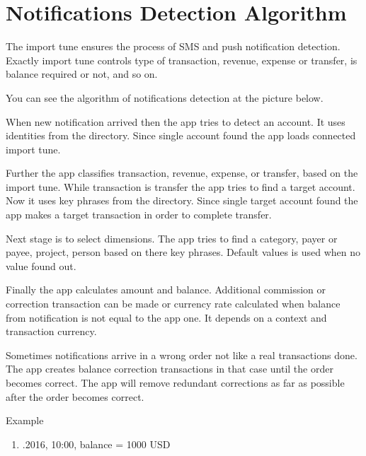 \documentclass[a4paper,10pt,english]{sphinxmanual}
\begin{document}
\section{Notifications Detection Algorithm}
\label{\detokenize{notifications:notifications-detection-algorithm}}
\sphinxAtStartPar
The import tune ensures the process of SMS and push notification detection. Exactly import
tune controls type of transaction, revenue, expense or transfer, is balance required or not,
and so on.

\sphinxAtStartPar
You can see the algorithm of notifications detection at the picture below.


\sphinxAtStartPar
When new notification arrived then the app tries to detect an account. It uses identities from the
 directory. Since single account found the app loads connected import tune.

\sphinxAtStartPar
Further the app classifies transaction, revenue, expense, or transfer, based on the import tune.
While transaction is transfer the app tries to find a target account. Now it uses key phrases from the
 directory. Since single target account found the app makes a target transaction
in order to complete transfer.

\sphinxAtStartPar
Next stage is to select dimensions. The app tries to find a category, payer or payee, project, person
based on there key phrases. Default values is used when no value found out.

\sphinxAtStartPar
Finally the app calculates amount and balance. Additional commission or correction
transaction can be made or currency rate calculated when balance from notification is not equal to the app one.
It depends on a context and transaction currency.

\sphinxAtStartPar
Sometimes notifications arrive in a wrong order not like a real transactions done. The app
creates balance correction transactions in that case until the order becomes correct.
The app will remove redundant corrections as far as possible after the order becomes correct.

\sphinxAtStartPar
Example
\begin{enumerate}
%
\item {} 
.2016, 10:00, balance = 1000 USD

\end{enumerate}
\end{document}
